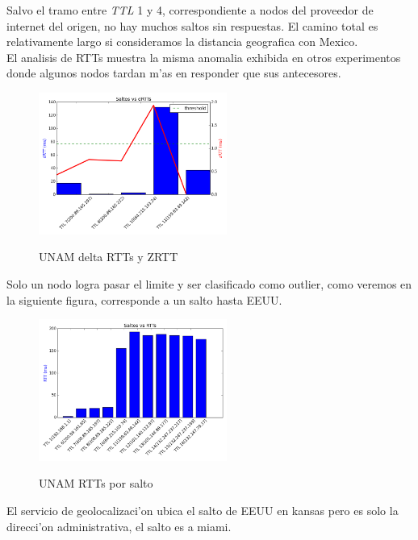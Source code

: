 \smallskip

Salvo el tramo entre \textit{TTL} 1 y 4, correspondiente a nodos del proveedor de internet del origen, no hay muchos saltos sin respuestas. El camino total es relativamente largo si consideramos la distancia geografica con Mexico.\\


El analisis de RTTs muestra la misma anomalia exhibida en otros experimentos donde algunos nodos tardan m'as en responder que sus antecesores.
 
\begin{figure}[H]
\centering
\caption{UNAM delta RTTs y ZRTT}
\includegraphics[width=0.55\textwidth]{modules/unam_rtts_2}
 \label{fig:unam_rtts_2}
\end{figure}


Solo un nodo logra pasar el limite y ser clasificado como outlier, como veremos en la siguiente figura, corresponde a un salto hasta EEUU.

\begin{figure}[H]
\centering
\caption{UNAM RTTs por salto}
\includegraphics[width=0.55\textwidth]{modules/unam_rtts_1}
 \label{fig:unam_rtts}
\end{figure}

El servicio de geolocalizaci'on ubica el salto de EEUU en kansas pero es solo la direcci'on administrativa, el salto es a miami.


